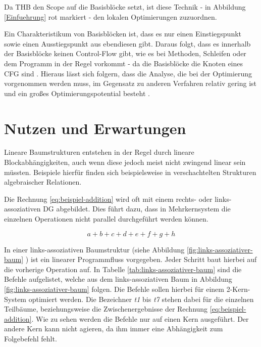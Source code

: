 Da \ac{THB} den Scope auf die Basisblöcke setzt, ist diese Technik - in Abbildung \ref{Einfuehrung} rot markiert - den lokalen Optimierungen zuzuordnen.

Ein Charakteristikum von Basisblöcken ist, dass es nur einen Einstiegspunkt sowie einen Ausstiegspunkt aus ebendiesen gibt. Daraus folgt, dass es innerhalb der Basisblöcke keinen Control-Flow gibt, wie es bei Methoden, Schleifen oder dem Programm in der Regel vorkommt - da die Basisblöcke die Knoten eines \ac{CFG} sind \cite{Allen:1970:CFA:390013.808479}. Hieraus lässt sich folgern, dass die Analyse, die bei der Optimierung vorgenommen werden muss, im Gegensatz zu anderen Verfahren relativ gering ist und ein großes Optimierungspotential besteht \cite{HeBIS-309344573}.




\section{Nutzen und Erwartungen}
\label{Nutzen}
Lineare Baumstrukturen entstehen in der Regel durch lineare Blockabhängigkeiten, auch wenn diese jedoch meist nicht zwingend linear sein müssten. Beispiele hierfür finden sich beispielsweise in verschachtelten Strukturen algebraischer Relationen.

Die Rechnung \ref{eq:beispiel-addition} wird oft mit einem rechts- oder links-assoziativen DG abgebildet. Dies führt dazu, dass in Mehrkernsystem die einzelnen Operationen nicht parallel durchgeführt werden können.

\begin{equation} \label{eq:beispiel-addition}
a + b + c + d + e + f + g + h
\end{equation}

In einer links-assoziativen Baumstruktur (siehe Abbildung \ref{fig:links-assoziativer-baum} \cite{HeBIS-309344573}) ist ein linearer Programmfluss vorgegeben. Jeder Schritt baut hierbei auf die vorherige Operation auf. In Tabelle \ref{tab:links-assoziativer-baum} sind die Befehle aufgelistet, welche aus dem links-assoziativen Baum in Abbildung \ref{fig:links-assoziativer-baum} folgen. Die Befehle sollen hierbei für einem 2-Kern-System optimiert werden. Die Bezeichner \textit{t1} bis \textit{t7} stehen dabei für die einzelnen Teilbäume, beziehungsweise die Zwischenergebnisse der Rechnung \ref{eq:beispiel-addition}. Wie zu sehen werden die Befehle nur auf einen Kern ausgeführt. Der andere Kern kann nicht agieren, da ihm immer eine Abhängigkeit zum Folgebefehl fehlt.

